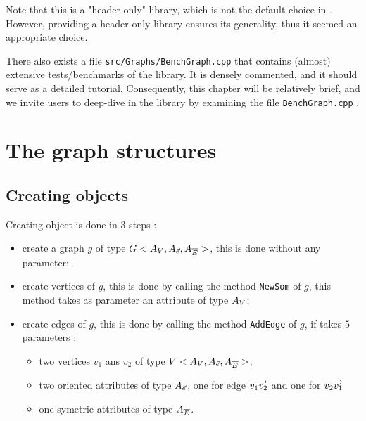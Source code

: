 Note that this is a "header only"  library, which is not the default choice in \PPP. However, providing a header-only library ensures its generality, thus it seemed an appropriate choice.

There also exists a file {\tt src/Graphs/BenchGraph.cpp} that contains (almost) extensive tests/benchmarks of the library.
It is densely commented, and it should serve as a detailed tutorial. Consequently, this chapter will be relatively
brief, and we invite users to deep-dive in the library by examining the file {\tt BenchGraph.cpp} .


\section{The graph structures}


\subsection{Creating objects}

Creating object is done in $3$ steps  :

\begin{itemize}
    \item  create a graph $g$ of type  $G<A_V,A_{\vec{e}},A_{\overline{E}}>$, this is done
           without any parameter;

    \item  create vertices  of $g$,  this is done by calling the method {\tt NewSom} of $g$,
          this method takes as parameter an attribute of type $A_V$;

    \item  create edges  of  $g$,  this is done by calling the method {\tt AddEdge} of $g$,
           if takes $5$  parameters :

    \begin{itemize}
          \item two vertices $v_1$ ans $v_2$  of type $V<A_V,A_{\vec{e}},A_{\overline{E}}>$;
          \item two oriented attributes of type $A_{\vec{e}}$, one for edge $\overrightarrow{v_1 v_2}$
                and one for  $\overrightarrow{v_2 v_1}$
          \item one symetric attributes of type $A_{\overline{E}}$.
    \end{itemize}
\end{itemize}

